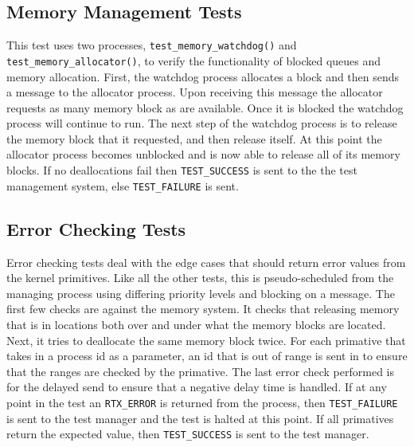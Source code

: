 \documentclass[oneside]{article}
\begin{document}
\subsection*{Memory Management Tests}
This test uses two processes, \texttt{test\_memory\_watchdog()} and 
\texttt{test\_memory\_allocator()}, to verify the functionality of blocked 
queues and memory allocation. First, the watchdog process allocates a block and 
then sends a message to the allocator process. Upon receiving this message the 
allocator requests as many memory block as are available. Once it is blocked the 
watchdog process will continue to run. The next step of the watchdog process is 
to release the memory block that it requested, and then release itself. At this 
point the allocator process becomes unblocked and is now able to release all of 
its memory blocks. If no deallocations fail then \texttt{TEST\_SUCCESS} is sent 
to the the test management system, else \texttt{TEST\_FAILURE} is sent.

\subsection*{Error Checking Tests}
Error checking tests deal with the edge cases that should return error values
from the kernel primitives. Like all the other tests, this is pseudo-scheduled
from the managing process using differing priority levels and blocking on a
message. The first few checks are against the memory system. It checks that
releasing memory that is in locations both over and under what the memory
blocks are located. Next, it tries to deallocate the same memory block twice.
For each primative that takes in a process id as a parameter, an id that is out
of range is sent in to ensure that the ranges are checked by the primative. The
last error check performed is for the delayed send to ensure that a negative
delay time is handled. If at any point in the test an \texttt{RTX\_ERROR} is
returned from the process, then \texttt{TEST\_FAILURE} is sent to the test
manager and the test is halted at this point. If all primatives return the
expected value, then \texttt{TEST\_SUCCESS} is sent to the test manager.
\end{document}
